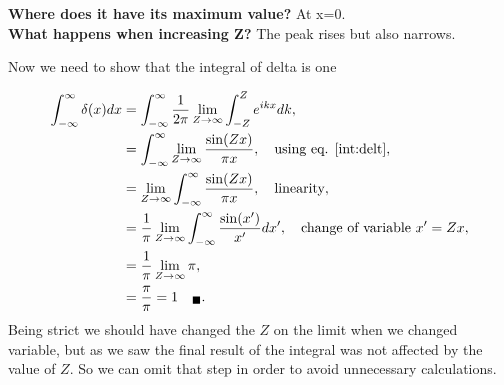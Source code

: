 \begin{questions}
\begin{solution}
 \textbf{Where does it have its maximum value?} At x=0.\\

 \textbf{What happens when increasing Z?} The peak rises but also narrows.\\

 \end{solution}

 \begin{solution}

 Now we need to show that the integral of delta is one

 \begin{equation}
   \begin{aligned}[b]
     \int_{-\infty}^\infty \delta(x) dx &= \int_{-\infty}^\infty \frac{1}{2\pi} \lim_{Z\rightarrow \infty} \int_{-Z}^Z e^{ikx}dk,\\
     &= \int_{-\infty}^\infty \lim_{Z\rightarrow \infty} \frac{\sin(Zx)}{\pi x},\quad  \textnormal{using eq. \ref{int:delt}},\\
     &=\lim_{Z\rightarrow \infty} \int_{-\infty}^\infty  \frac{\sin(Zx)}{\pi x}, \quad \textnormal{linearity},\\
     &= \frac{1}{\pi}\lim_{Z\rightarrow \infty} \int_{-\infty}^\infty \frac{\sin(x')}{ x'}dx', \quad \textnormal{change of variable $x'=Zx$},\\
     &= \frac{1}{\pi}\lim_{Z\rightarrow \infty} \pi,\\
     &= \frac{\pi}{\pi} = 1 \quad _\blacksquare. \label{integral}
   \end{aligned}
 \end{equation}
 Being strict we should have changed the $Z$ on the limit when we changed variable, but as we saw the final result of the integral was not affected by the value of $Z$. So we can omit that step in order to avoid unnecessary calculations.
\end{solution}


\end{questions}
